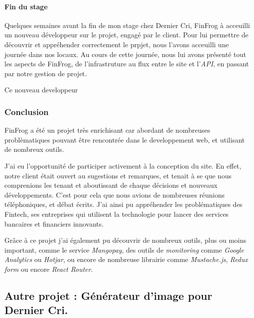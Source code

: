 \documentclass[12pt,a4paper]{article}
\begin{document}
  \bigskip

  \paragraph{Fin du stage}\label{fin-du-stage}

  Quelques semaines avant la fin de mon stage chez Dernier Cri, FinFrog à
  acceuilli un nouveau développeur sur le projet, engagé par le client.
  Pour lui permettre de découvrir et appréhender correctement le prpjet,
  nous l'avons acceuilli une journée dans nos locaux. Au cours de cette
  journée, nous lui avons présenté tout les aspects de FinFrog, de
  l'infrastruture au flux entre le site et l'\emph{API}, en passant par
  notre gestion de projet.

  \bigskip

  Ce nouveau developpeur

  \subsubsection{Conclusion}\label{conclusion-1}

  FinFrog a été un projet très enrichisant car abordant de nombreuses
  problèmatiques pouvant être rencontrée dans le developpement web, et
  utilisant de nombreux outils.

  \bigskip

  J'ai eu l'opportunité de participer activement à la conception du site.
  En effet, notre client était ouvert au sugestions et remarques, et
  tenait à se que nous comprenions les tenant et aboutissant de chaque
  décisions et nouveaux développements. C'est pour cela que nous avions de
  nombreuses réunions téléphoniques, et débat écrits. J'ai ainsi pu
  appréhender les problématiques des Fintech, ses entreprises qui
  utilisent la technologie pour lancer des services bancaires et
  financiers innovants.

  \bigskip

  Grâce à ce projet j'ai également pu découvrir de nombreux outils, plus
  ou moins important, comme le service \emph{Mangopay}, des outils de
  \emph{monitoring} comme \emph{Google Analytics} ou \emph{Hotjar}, ou
  encore de nombreuse librairie comme \emph{Mustache.js}, \emph{Redux
  form} ou encore \emph{React Router}.

  \bigskip

  \subsection{Autre projet : Générateur d'image pour Dernier
  Cri.}\label{autre-projet-guxe9nuxe9rateur-dimage-pour-dernier-cri.}
\end{document}
